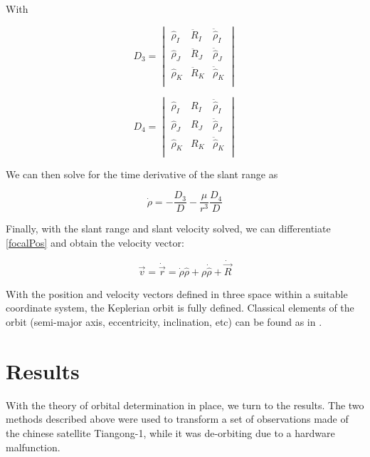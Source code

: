 \documentclass[11pt,twoside,letterpaper]{article}
\begin{document}
  With

  \begin{equation} \label{D3}
    D_3 = \begin{vmatrix}
    \hat{\rho}_I& \ddot{R}_I& \ddot{\hat{\rho}}_I \\
    \hat{\rho}_J& \ddot{R}_J& \ddot{\hat{\rho}}_J \\
    \hat{\rho}_K& \ddot{R}_K& \ddot{\hat{\rho}}_K \\
    \end{vmatrix}
  \end{equation}

  \begin{equation} \label{D4}
    D_4 = \begin{vmatrix}
    \hat{\rho}_I& R_I& \ddot{\hat{\rho}}_I \\
    \hat{\rho}_J& R_J& \ddot{\hat{\rho}}_J \\
    \hat{\rho}_K& R_K& \ddot{\hat{\rho}}_K \\
    \end{vmatrix}
  \end{equation}

  We can then solve for the time derivative of the slant range as

  \begin{equation} \label{slantDot}
    \dot{\rho} = -\frac{D_3}{D} - \frac{\mu}{r^3}\frac{D_4}{D}
  \end{equation}

  Finally, with the slant range and slant velocity solved, we can
  differentiate \ref{focalPos} and obtain the velocity vector:

  \begin{equation}\label{focalVel}
    \vec{v} = \dot{\vec{r}} =
    \dot{\rho}\hat{\rho} + \rho\dot{\hat{\rho}} + \dot{\vec{R}}
  \end{equation}

  With the position and velocity vectors defined in three space within
  a suitable coordinate system, the Keplerian orbit is fully
  defined. Classical elements of the orbit (semi-major axis,
  eccentricity, inclination, etc) can be found as in \cite{kluever_2018}.

  \section{Results}
  With the theory of orbital determination in place, we turn to the
  results. The two methods described above were used to transform a
  set of observations made of the chinese satellite Tiangong-1, while
  it was de-orbiting due to a hardware malfunction.
\end{document}

